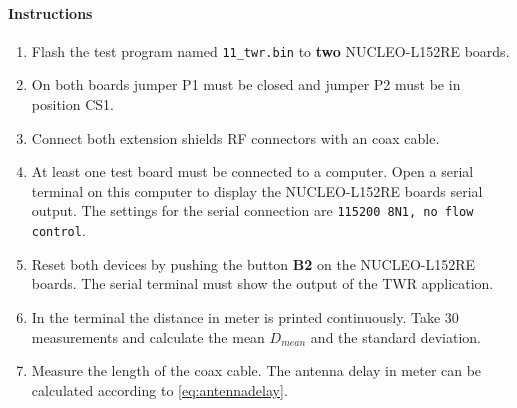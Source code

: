 \documentclass[journal,comsoc]{IEEEtran}
\begin{document}
\paragraph{Instructions}
\begin{enumerate}
	\item Flash the test program named \texttt{11\_twr.bin} to \textbf{two} NUCLEO-L152RE boards.
	\item On both boards jumper P1 must be closed and jumper P2 must be in position CS1. 
	\item Connect both extension shields RF connectors with an coax cable.
	\item At least one test board must be connected to a computer. Open a serial terminal on this computer to display the NUCLEO-L152RE boards serial output. The settings for the serial connection are \texttt{115200 8N1, no flow control}.
	\item Reset both devices by pushing the button \textbf{B2} on the NUCLEO-L152RE boards. The serial terminal must show the output of the TWR application.
	\item In the terminal the distance in meter is printed continuously. Take 30 measurements and calculate the mean $D_{mean}$ and the standard deviation.
	\item Measure the length of the coax cable. The antenna delay in meter can be calculated according to \eqref{eq:antennadelay}.
\end{enumerate}
\end{document}
